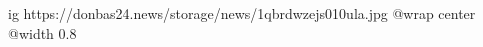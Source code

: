  
 
 
 
 

\ifcmt
  ig https://donbas24.news/storage/news/1qbrdwzejs010ula.jpg
  @wrap center
  @width 0.8
\fi
